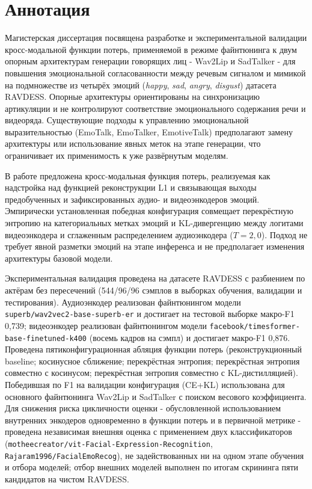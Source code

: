 \documentclass[a4paper, 12pt, oneside, openany]{article}
\begin{document}
\newpage
\setcounter{page}{2}
\section{Аннотация}
Магистерская диссертация посвящена разработке и экспериментальной валидации кросс-модальной функции потерь, применяемой в режиме файнтюнинга к двум опорным архитектурам генерации говорящих лиц - Wav2Lip и SadTalker - для повышения эмоциональной согласованности между речевым сигналом и мимикой на подмножестве из четырёх эмоций (\textit{happy}, \textit{sad}, \textit{angry}, \textit{disgust}) датасета RAVDESS. Опорные архитектуры ориентированы на синхронизацию артикуляции и не контролируют соответствие эмоционального содержания речи и видеоряда. Существующие подходы к управлению эмоциональной выразительностью (EmoTalk, EmoTalker, EmotiveTalk) предполагают замену архитектуры или использование явных меток на этапе генерации, что ограничивает их применимость к уже развёрнутым моделям.

В работе предложена кросс-модальная функция потерь, реализуемая как надстройка над функцией реконструкции L1 и связывающая выходы предобученных и зафиксированных аудио- и видеоэнкодеров эмоций. Эмпирически установленная победная конфигурация совмещает перекрёстную энтропию на категориальных метках эмоций и KL-дивергенцию между логитами видеоэнкодера и сглаженным распределением аудиоэнкодера ($T=2{,}0$). Подход не требует явной разметки эмоций на этапе инференса и не предполагает изменения архитектуры базовой модели.

Экспериментальная валидация проведена на датасете RAVDESS с разбиением по актёрам без пересечений (544/96/96 сэмплов в выборках обучения, валидации и тестирования). Аудиоэнкодер реализован файнтюнингом модели \texttt{superb/wav2vec2-base-superb-er} и достигает на тестовой выборке макро-F1 0,739; видеоэнкодер реализован файнтюнингом модели \texttt{facebook/timesformer-base-finetuned-k400} (восемь кадров на сэмпл) и достигает макро-F1 0,876. Проведена пятиконфигурационная абляция функции потерь (рекон\-струкционный baseline; косинусное сближение; перекрёстная энтропия; перекрёстная энтропия совместно с косинусом; перекрёстная энтропия совместно с KL-дистилляцией). Победившая по F1 на валидации конфигурация (CE+KL) использована для основного файнтюнинга Wav2Lip и SadTalker с поиском весового коэффициента. Для снижения риска цикличности оценки - обусловленной использованием внутренних энкодеров одновременно в функции потерь и в первичной метрике - проведена независимая внешняя оценка с применением двух классификаторов (\texttt{motheecreator/vit-Facial-Expression-Recognition}, \texttt{Rajaram1996/FacialEmoRecog}), не задействованных ни на одном этапе обучения и отбора моделей; отбор внешних моделей выполнен по итогам скрининга пяти кандидатов на чистом RAVDESS.
\end{document}
